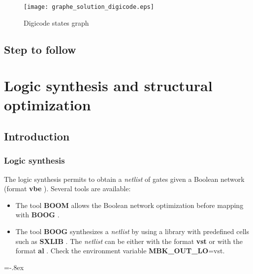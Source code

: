 \documentclass[12pt]{article}
\newenvironment{commandline}
  {\VerbatimEnvironment\par\vspace*{2mm}\noindent\footnotesize
   \begin{Sbox}\begin{minipage}{.979\textwidth}\begin{Verbatim}}%
  {\end{Verbatim}\end{minipage}\end{Sbox}\setlength{\shadowsize}{2pt}%
  \shadowbox{\TheSbox}\normalsize\par\noindent}
\begin{document}
{\begin{figure}[H]\centering
 \texttt{[image: graphe\_solution\_digicode.eps]}
 \caption{Digicode states graph}
 \label{Fig:graph 2}
\end{figure}

\subsection{Step to follow}


\newpage

\section{Logic synthesis and structural optimization}

\subsection{Introduction}

\subsubsection{Logic synthesis}
    The logic synthesis permits to obtain a { \it netlist } of
    gates given a Boolean network (format { \bf vbe }). 
    Several tools are available:

\begin{itemize}\itemsep=-.8ex
\item  The tool { \bf BOOM } allows the Boolean network optimization before mapping with { \bf BOOG }.
\item  The tool { \bf BOOG } synthesizes a { \it netlist } by using a library
       with predefined cells such as { \bf SXLIB }.
       The { \it netlist } can be either with the format { \bf vst } or with the format { \bf al }.
       Check the environment variable { \bf MBK\_OUT\_LO}=vst.
\end{itemize}\itemsep=-.8ex

}
\end{document}
